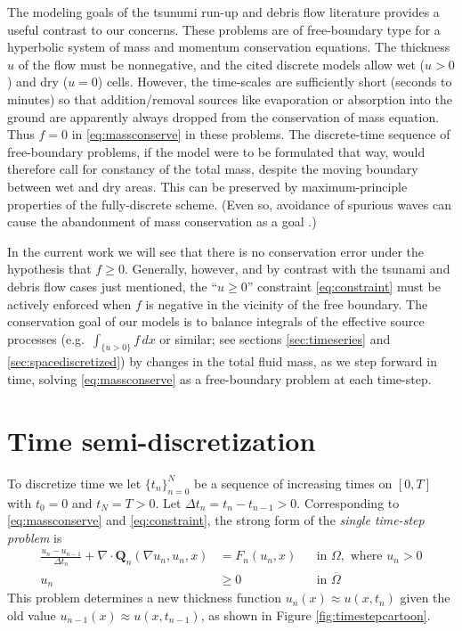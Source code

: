 \documentclass[final,leqno,onefignum,onetabnum]{siamltex1213bueler}
\newcommand\bQ{\mathbf{Q}}
\newcommand{\Div}{\nabla\cdot}
\renewcommand{\grad}{\nabla}
\begin{document}
The modeling goals of the tsunumi run-up \cite{LeVequeetal2011} and debris flow \cite{GeorgeIverson2014} literature provides a useful contrast to our concerns.  These problems are of free-boundary type for a hyperbolic system of mass and momentum conservation equations.  The thickness $u$ of the flow must be nonnegative, and the cited discrete models allow wet ($u>0$) and dry ($u=0$) cells.  However, the time-scales are sufficiently short (seconds to minutes) so that addition/removal sources like evaporation or absorption into the ground are apparently always dropped from the conservation of mass equation.  Thus $f=0$ in \eqref{eq:massconserve} in these problems.  The discrete-time sequence of free-boundary problems, if the model were to be formulated that way, would therefore call for constancy of the total mass, despite the moving boundary between wet and dry areas.  This can be preserved by maximum-principle properties of the fully-discrete scheme.  (Even so, avoidance of spurious waves can cause the abandonment of mass conservation as a goal \cite[section 9.2]{LeVequeetal2011}.)

In the current work we will see that there is no conservation error under the hypothesis that $f\ge 0$.  Generally, however, and by contrast with the tsunami and debris flow cases just mentioned, the ``$u\ge 0$'' constraint \eqref{eq:constraint} must be actively enforced when $f$ is negative in the vicinity of the free boundary.  The conservation goal of our models is to balance integrals of the effective source processes (e.g.~$\int_{\{u>0\}} f\,dx$ or similar; see sections \ref{sec:timeseries} and \ref{sec:spacediscretized}) by changes in the total fluid mass, as we step forward in time, solving \eqref{eq:massconserve} as a free-boundary problem at each time-step.


\section{Time semi-discretization}  \label{sec:strongform}  To discretize time we let $\{t_n\}_{n=0}^N$ be a sequence of increasing times on $[0,T]$ with $t_0=0$ and $t_N=T>0$.  Let $\Delta t_n = t_n-t_{n-1}>0$.  Corresponding to \eqref{eq:massconserve} and \eqref{eq:constraint}, the strong form of the \emph{single time-step problem} is
\begin{align}
\frac{u_n - u_{n-1}}{\Delta t_n} + \Div \bQ_n(\grad u_n,u_n,x) &= F_n(u_n,x) &&\text{in } \Omega, \text{ where } u_n > 0 \label{eq:semimassconserve} \\
u_n &\ge 0 &&\text{in } \overline{\Omega} \label{eq:semiconstraint}
\end{align}
This problem determines a new thickness function $u_n(x) \approx u(x,t_n)$ given the old value $u_{n-1}(x) \approx u(x,t_{n-1})$, as shown in Figure \ref{fig:timestepcartoon}.
\end{document}
